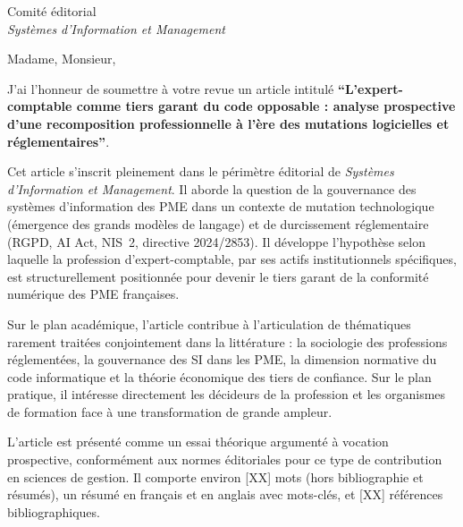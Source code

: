 \documentclass[12pt,a4paper]{letter}
\begin{document}

\begin{letter}{%
  Comité éditorial\\
  \textit{Systèmes d'Information et Management}\\
}

\opening{Madame, Monsieur,}

J'ai l'honneur de soumettre à votre revue un article intitulé \textbf{\enquote{L'expert-comptable comme tiers garant du code opposable : analyse prospective d'une recomposition professionnelle à l'ère des mutations logicielles et réglementaires}}.

Cet article s'inscrit pleinement dans le périmètre éditorial de \textit{Systèmes d'Information et Management}. Il aborde la question de la gouvernance des systèmes d'information des PME dans un contexte de mutation technologique (émergence des grands modèles de langage) et de durcissement réglementaire (RGPD, AI Act, NIS~2, directive 2024/2853). Il développe l'hypothèse selon laquelle la profession d'expert-comptable, par ses actifs institutionnels spécifiques, est structurellement positionnée pour devenir le tiers garant de la conformité numérique des PME françaises.


Sur le plan académique, l'article contribue à l'articulation de thématiques rarement traitées conjointement dans la littérature : la sociologie des professions réglementées, la gouvernance des SI dans les PME, la dimension normative du code informatique et la théorie économique des tiers de confiance. Sur le plan pratique, il intéresse directement les décideurs de la profession et les organismes de formation face à une transformation de grande ampleur.

L'article est présenté comme un essai théorique argumenté à vocation prospective, conformément aux normes éditoriales pour ce type de contribution en sciences de gestion. Il comporte environ [XX] mots (hors bibliographie et résumés), un résumé en français et en anglais avec mots-clés, et [XX] références bibliographiques.


\end{letter}
\end{document}

